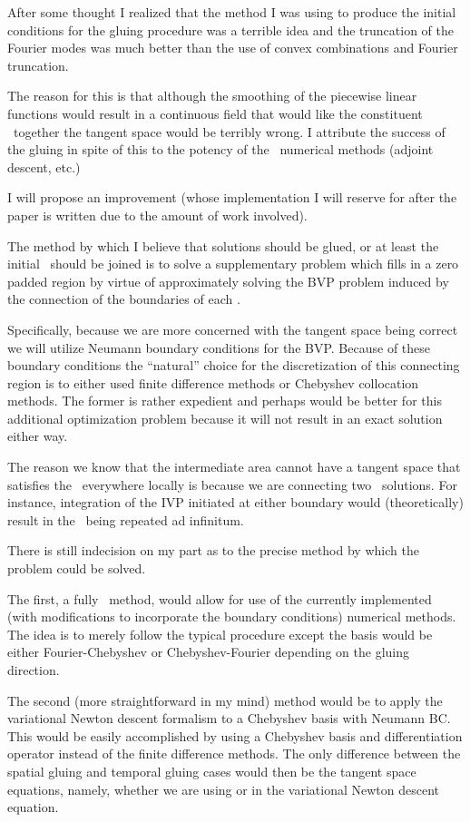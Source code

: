 \begin{itemize}
After some thought I realized that the
method I was using to produce the initial
conditions for the gluing procedure was
a terrible idea and the truncation of the
Fourier modes was much better than the use
of convex combinations and Fourier truncation.

The reason for this is that although the smoothing
of the piecewise linear functions would result in
a continuous field that would like the constituent
\twots\ together the tangent space would be terribly
wrong. I attribute the success of the gluing in spite
of this to the potency of the \spt\ numerical methods (adjoint
descent, etc.)

I will propose an improvement (whose implementation
I will reserve for after the paper is written due to
the amount of work involved).

The method by which I believe that solutions should be
glued, or at least the initial \twots\ should be
joined is to solve a supplementary problem which
fills in a zero padded region by virtue of approximately
solving the BVP problem induced by the connection of the boundaries
of each \twot.

Specifically, because we are more concerned with the
tangent space being correct we will utilize Neumann
boundary conditions for the BVP. Because of these
boundary conditions the ``natural'' choice for the
discretization of this connecting region is to
either used finite difference methods or
Chebyshev collocation methods. The former
is rather expedient and perhaps would be better
for this additional optimization problem because
it will not result in an exact solution either way.

The reason we know that the intermediate area
cannot have a tangent space that satisfies the \KSe\
everywhere locally is because we are connecting two
\twot\ solutions. For instance, integration of the
IVP initiated at either boundary would (theoretically)
result in the \twot\ being repeated ad infinitum.

There is still indecision on my part as to the
precise method by which the problem could be solved.

The first, a fully \spt\ method, would allow for
use of the currently implemented (with modifications
to incorporate the boundary conditions) numerical
methods. The idea is to merely follow the typical
procedure except the basis would be either Fourier-Chebyshev
or Chebyshev-Fourier depending on the gluing direction.

The second (more straightforward in my mind) method
would be to apply the variational Newton descent formalism
to a Chebyshev basis with Neumann BC. This would be
easily accomplished by using a Chebyshev basis and
differentiation operator instead of the finite difference
methods. The only difference between the spatial gluing
and temporal gluing cases would then be
the tangent space equations,
namely, whether we are using  or 
in the variational Newton descent equation.


\end{itemize}
